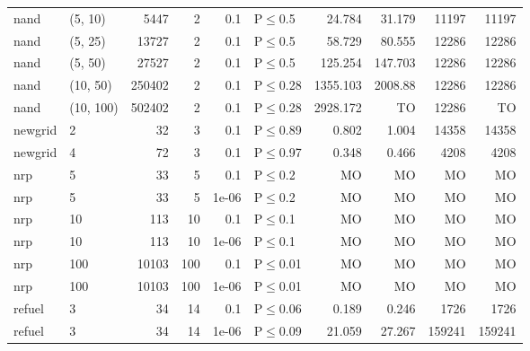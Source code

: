 \begin{longtable}{llrrrlrrrr}
 nand          & (5, 10)   &   	5447 &   2 & 0.1   & P$\leq$0.5   & 24.784   & 31.179  & 11197  & 11197  \\
 nand          & (5, 25)   &  	13727 &   2 & 0.1   & P$\leq$0.5   & 58.729   & 80.555  & 12286  & 12286  \\
 nand          & (5, 50)   &  	27527 &   2 & 0.1   & P$\leq$0.5   & 125.254  & 147.703 & 12286  & 12286  \\
 nand          & (10, 50)  & 	250402 &   2 & 0.1   & P$\leq$0.28  & 1355.103 & 2008.88 & 12286  & 12286  \\
 nand          & (10, 100) & 	502402 &   2 & 0.1   & P$\leq$0.28  & 2928.172 & TO      & 12286  & TO     \\
 newgrid       & 2         &     	32 &   3 & 0.1   & P$\leq$0.89  & 0.802    & 1.004   & 14358  & 14358  \\
 newgrid       & 4         &     	72 &   3 & 0.1   & P$\leq$0.97  & 0.348    & 0.466   & 4208   & 4208   \\
 nrp           & 5         &     	33 &   5 & 0.1   & P$\leq$0.2   & MO       & MO      & MO     & MO     \\
 nrp           & 5         &     	33 &   5 & 1e-06 & P$\leq$0.2   & MO       & MO      & MO     & MO     \\
 nrp           & 10        &    	113 &  10 & 0.1   & P$\leq$0.1   & MO       & MO      & MO     & MO     \\
 nrp           & 10        &    	113 &  10 & 1e-06 & P$\leq$0.1   & MO       & MO      & MO     & MO     \\
 nrp           & 100       &  	10103 & 100 & 0.1   & P$\leq$0.01  & MO       & MO      & MO     & MO     \\
 nrp           & 100       &  	10103 & 100 & 1e-06 & P$\leq$0.01  & MO       & MO      & MO     & MO     \\
 refuel        & 3         &     	34 &  14 & 0.1   & P$\leq$0.06  & 0.189    & 0.246   & 1726   & 1726   \\
 refuel        & 3         &     	34 &  14 & 1e-06 & P$\leq$0.09  & 21.059   & 27.267  & 159241 & 159241 \\
\bottomrule
\end{longtable}
